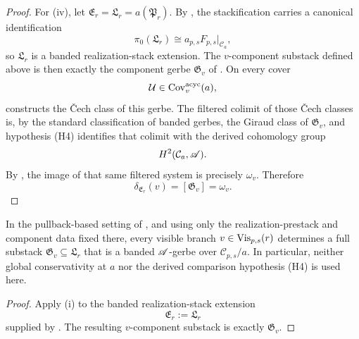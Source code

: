 \begin{proof}
For \textup{(iv)}, let $\mathfrak E_r=\mathfrak L_r=a(\mathfrak P_r)$. By , the stackification carries a canonical identification
\[
\pi_0(\mathfrak L_r)\cong a_{p,s}F_{p,s}|_{\mathcal C_a},
\]
so $\mathfrak L_r$ is a banded realization-stack extension. The $v$-component substack defined above is then exactly the component gerbe $\mathfrak G_v$ of . On every cover
\[
\mathcal U\in \mathrm{Cov}_v^{\mathrm{acyc}}(a),
\]
 constructs the \v{C}ech class of this gerbe. The filtered colimit of those \v{C}ech classes is, by the standard classification of banded gerbes, the Giraud class of $\mathfrak G_v$, and hypothesis \textup{(H4)} identifies that colimit with the derived cohomology group
\[
H^2(\mathcal C_a,\mathscr{A}).
\]
By , the image of that same filtered system is precisely $\omega_v$. Therefore
\[
\delta_{\mathfrak E_r}(v)=[\mathfrak G_v]=\omega_v.
\]
\end{proof}

\begin{proposition}\label{thm:component-gerbe-decomposition}
In the pullback-based setting of , and using only the realization-prestack and component data fixed there, every visible branch $v\in \mathrm{Vis}_{p,s}(r)$ determines a full substack $\mathfrak G_v\subseteq \mathfrak L_r$ that is a banded $\mathscr{A}$-gerbe over $\mathcal C_{p,s}/a$. In particular, neither global conservativity at $a$ nor the derived comparison hypothesis \textup{(H4)} is used here.
\end{proposition}

\begin{proof}
Apply (i) to the banded realization-stack extension
\[
\mathfrak E_r:=\mathfrak L_r
\]
supplied by . The resulting $v$-component substack is exactly $\mathfrak G_v$.
\end{proof}

